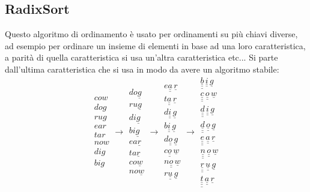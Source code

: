 \documentclass[a4paper,12pt,oneside,tikz]{book}
\begin{document}
\subsection{RadixSort}
Questo algoritmo di ordinamento è usato per ordinamenti su più chiavi diverse, ad esempio per ordinare un insieme di elementi in base ad una loro caratteristica, a parità di quella caratteristica si usa un'altra caratteristica etc... Si parte dall'ultima caratteristica che si usa in modo da avere un algoritmo stabile:
$$
	\begin{matrix}
		cow \\
		dog \\
		rug \\
		ear \\
		tar \\
		now \\
		dig \\
		big
	\end{matrix}\longrightarrow\begin{matrix}
		do\underline{g} \\
		ru\underline{g} \\
		di\underline{g} \\
		bi\underline{g} \\
		ea\underline{r} \\
		ta\underline{r} \\
		co\underline{w} \\
		no\underline{w}
	\end{matrix}\longrightarrow \begin{matrix}
		e\underline{\underline{a}}\,\underline{r} \\
		t\underline{\underline{a}}\,\underline{r} \\
		d\underline{\underline{i}}\,\underline{g} \\
		b\underline{\underline{i}}\,\underline{g} \\
		d\underline{\underline{o}}\,\underline{g} \\
		c\underline{\underline{o}}\,\underline{w} \\
		n\underline{\underline{o}}\,\underline{w} \\
		r\underline{\underline{u}}\,\underline{g}
	\end{matrix}\longrightarrow\begin{matrix}
		\underline{\underline{\underline{b}}}\,\underline{\underline{i}}\,\underline{g} \\
		\underline{\underline{\underline{c}}}\,\underline{\underline{o}}\,\underline{w} \\
		\underline{\underline{\underline{d}}}\,\underline{\underline{i}}\,\underline{g} \\
		\underline{\underline{\underline{d}}}\,\underline{\underline{o}}\,\underline{g} \\
		\underline{\underline{\underline{e}}}\,\underline{\underline{a}}\,\underline{r} \\
		\underline{\underline{\underline{n}}}\,\underline{\underline{o}}\,\underline{w} \\
		\underline{\underline{\underline{r}}}\,\underline{\underline{u}}\,\underline{g} \\
		\underline{\underline{\underline{t}}}\,\underline{\underline{a}}\,\underline{r}
	\end{matrix}
$$
\end{document}

